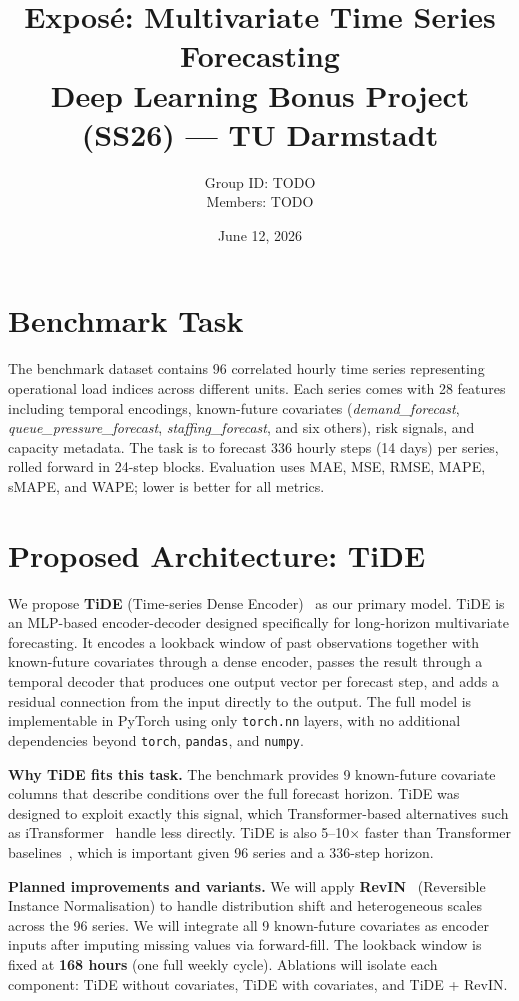 \documentclass[11pt,a4paper]{article}
\title{\textbf{Exposé: Multivariate Time Series Forecasting}\\
       \large Deep Learning Bonus Project (SS26) --- TU Darmstadt}
\author{Group ID: TODO \\ Members: TODO}
\date{June 12, 2026}
\begin{document}
\maketitle
\thispagestyle{empty}

\section*{Benchmark Task}

The benchmark dataset contains 96 correlated hourly time series representing
operational load indices across different units.
Each series comes with 28 features including temporal encodings, known-future
covariates (\textit{demand\_forecast}, \textit{queue\_pressure\_forecast},
\textit{staffing\_forecast}, and six others), risk signals, and capacity
metadata.
The task is to forecast 336 hourly steps (14 days) per series, rolled forward
in 24-step blocks.
Evaluation uses MAE, MSE, RMSE, MAPE, sMAPE, and WAPE; lower is better for
all metrics.

\section*{Proposed Architecture: TiDE}

We propose \textbf{TiDE} (Time-series Dense Encoder)~\cite{das2023tide} as our
primary model.
TiDE is an MLP-based encoder-decoder designed specifically for long-horizon
multivariate forecasting.
It encodes a lookback window of past observations together with known-future
covariates through a dense encoder, passes the result through a temporal
decoder that produces one output vector per forecast step, and adds a
residual connection from the input directly to the output.
The full model is implementable in PyTorch using only \texttt{torch.nn} layers,
with no additional dependencies beyond \texttt{torch}, \texttt{pandas}, and
\texttt{numpy}.

\textbf{Why TiDE fits this task.}
The benchmark provides 9 known-future covariate columns that describe
conditions over the full forecast horizon.
TiDE was designed to exploit exactly this signal, which Transformer-based
alternatives such as iTransformer~\cite{liu2024itransformer} handle less
directly.
TiDE is also 5--10$\times$ faster than Transformer baselines~\cite{das2023tide},
which is important given 96 series and a 336-step horizon.

\textbf{Planned improvements and variants.}
We will apply \textbf{RevIN}~\cite{kim2022revin} (Reversible Instance
Normalisation) to handle distribution shift and heterogeneous scales across the
96 series.
We will integrate all 9 known-future covariates as encoder inputs after
imputing missing values via forward-fill.
The lookback window is fixed at \textbf{168 hours} (one full weekly cycle).
Ablations will isolate each component: TiDE without covariates, TiDE with
covariates, and TiDE + RevIN.
\end{document}
